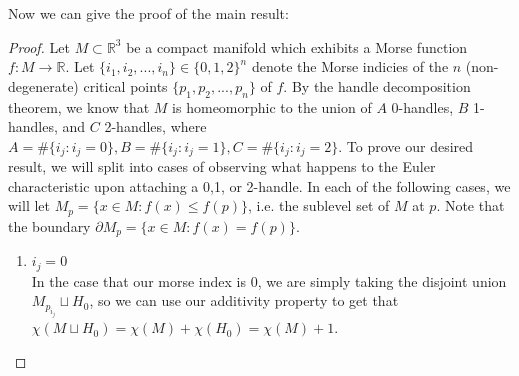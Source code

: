 \documentclass[12pt]{article}
\newcommand{\bR}{{\mathbb R}}
\theoremstyle{definition}
\begin{document}
Now we can give the proof of the main result:
\begin{proof}
      Let $M \subset \bR^3$ be a compact manifold which exhibits a Morse function $f:M \rightarrow \bR$. Let $\{i_1,i_2,...,i_n\}\in \{0,1,2\}^n$ denote the Morse indicies of the $n$ (non-degenerate) critical points $\{p_1,p_2,...,p_n\}$ of $f$. By the handle decomposition theorem, we know that $M$ is homeomorphic to the union of $A$ 0-handles, $B$ 1-handles, and $C$ 2-handles, where $A = \# \{i_j : i_j = 0\}, B = \# \{i_j : i_j = 1\}, C= \# \{i_j: i_j = 2\}$. To prove our desired result, we will split into cases of observing what happens to the Euler characteristic upon attaching a 0,1, or 2-handle. In each of the following cases, we will let $M_{p} = \{x \in M: f(x)\leq f(p)\}$, i.e. the sublevel set of $M$ at $p$. Note that the boundary $\partial M_{p} = \{x \in M : f(x) = f(p)\}$. 
      
      \begin{enumerate}
            \item $i_j = 0$\\
            In the case that our morse index is 0, we are simply taking the disjoint union $M_{p_{i_j}} \sqcup H_0$, so we can use our additivity property to get that $\chi(M \sqcup H_0) = \chi(M) + \chi(H_0) = \chi(M) + 1$. 


\end{enumerate}
\end{proof}
\end{document}
